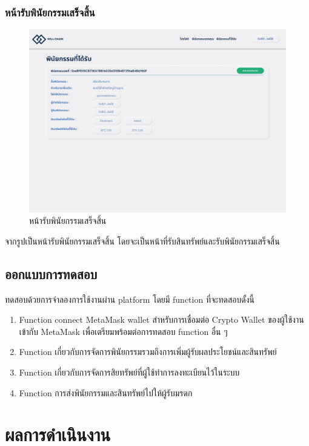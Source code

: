 \documentclass[12pt,oneside,openright,a4paper]{cpe-thai-project}
\begin{document}
\clearpage
\subsection{หน้ารับพินัยกรรมเสร็จสิ้น}
		\begin{figure}[!thb]
			\centering
			\includegraphics[scale=0.2]{claimWillSuccess}
			\caption{หน้ารับพินัยกรรมเสร็จสิ้น}
		\end{figure}
		\FloatBarrier
		\tab จากรูปเป็นหน้ารับพินัยกรรมเสร็จสิ้น โดยจะเป็นหน้าที่รับสินทรัพย์และรับพินัยกรรมเสร็จสิ้น
\section{ออกแบบการทดสอบ}
\tab ทดสอบด้วยการจำลองการใช้งานผ่าน platform โดยมี function ที่จะทดสอบดั้งนี้
	\begin{enumerate}[label=\thesection.\arabic*,leftmargin=0pt,itemindent=1.25cm]
		\item Function connect MetaMask wallet สําหรับการเชื่อมต่อ Crypto Wallet ของผู้ใช้งานเข้ากับ MetaMask เพื่อเตรียมพร้อมต่อการทดสอบ function อื่น ๆ
		\item Function เกี่ยวกับการจัดการพินัยกรรมรวมถึงการเพิ่มผู้รับผลประโยชน์และสินทรัพย์ 
		\item Function เกี่ยวกับการจัดการสิยทรัพย์ที่ผู้ใช้ทำการลงทะเบียนไว้ในระบบ
		\item Function การส่งพินัยกรรมและสินทรัพย์ไปให้ผู้รับมรดก
	\end{enumerate}

\chapter{ผลการดําเนินงาน}
\end{document}
